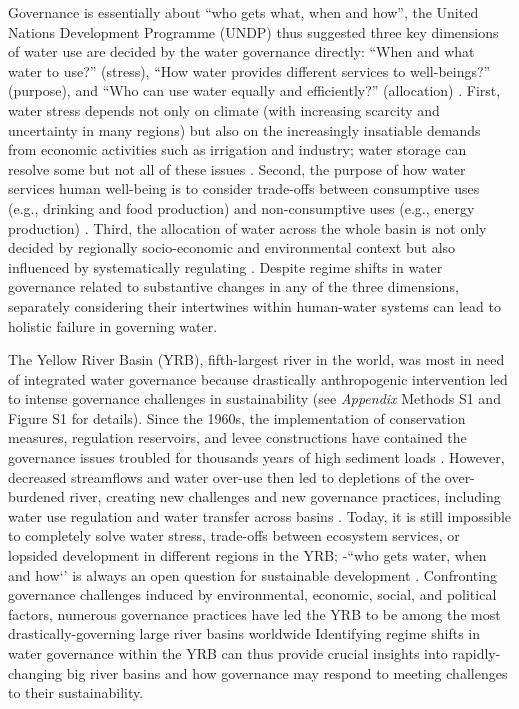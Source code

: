 Governance is essentially about ``who gets what, when and how'', the United Nations Development Programme (UNDP) thus suggested three key dimensions of water use are decided by the water governance directly: ``When and what water to use?'' (stress), ``How water provides different services to well-beings?'' (purpose), and ``Who can use water equally and efficiently?'' (allocation)
\cite{undpwatergovernancefacilityWaterGovernanceIssue, mariajacobsonUserguideassessing2013, kjellenWatergovernanceperspective2015}. %
First, water stress depends not only on climate (with increasing scarcity and uncertainty in many regions) but also on the increasingly insatiable demands from economic activities such as irrigation and industry; water storage can resolve some but not all of these issues
\cite{greveGlobalassessmentwater2018,wadaHumanwaterinterface2017,qinFlexibilityintensityglobal2019}.
Second, the purpose of how water services human well-being is to consider trade-offs between consumptive uses (e.g., drinking and food production) and non-consumptive uses (e.g., energy production)
\cite{liuWaterscarcityassessments2017,florkeWatercompetitioncities2018,kleemannQuantifyinginterregionalflows2020}.
Third, the allocation of water across the whole basin is not only decided by regionally socio-economic and environmental context but also influenced by systematically regulating
\cite{roobavannanRoleSectoralTransformation2017,speedBasinwaterallocation2013}.
Despite regime shifts in water governance related to substantive changes in any of the three dimensions, separately considering their intertwines within human-water systems can lead to holistic failure in governing water.

The Yellow River Basin (YRB), fifth-largest river in the world, was most in need of integrated water governance because drastically anthropogenic intervention led to intense governance challenges in sustainability (see \textit{Appendix} Methods S1 and Figure S1 for details).
Since the 1960s, the implementation of conservation measures, regulation reservoirs, and levee constructions have contained the governance issues troubled for thousands years of high sediment loads
\cite{wangReducedsedimenttransport2016,wuEvolutioneffectssocialecological2020}.
However, decreased streamflows and water over-use then led to depletions of the over-burdened river, creating new challenges and new governance practices, including water use regulation and water transfer across basins
\cite{xiaDevelopmentWaterAllocation2012}.
Today, it is still impossible to completely solve water stress, trade-offs between ecosystem services, or lopsided development in different regions in the YRB; -``who gets water, when and how‘’ is always an open question for sustainable development
\cite{wangYellowRiverwater2019,wohlfartSocialecologicalchallengesYellow2016}.
Confronting governance challenges induced by environmental, economic, social, and political factors, numerous governance practices have led the YRB to be among the most drastically-governing large river basins worldwide
Identifying regime shifts in water governance within the YRB can thus provide crucial insights into rapidly-changing big river basins and how governance may respond to meeting challenges to their sustainability.


